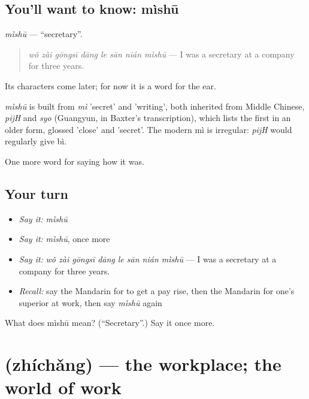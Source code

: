 \subsection*{You'll want to know: mìshū}
\emph{mìshū} — \textquotedblleft{}secretary\textquotedblright{}.

\begin{quote}
\emph{wǒ zài gōngsī dāng le sān nián mìshū} — I was a secretary at a company for three years.
\end{quote}

Its characters come later; for now it is a word for the ear.

\begin{cousinweb}
\emph{mìshū} is built from \emph{mì} 'secret' and  'writing', both inherited from Middle Chinese, \emph{pijH} and \emph{syo} (Guangyun, in Baxter's transcription), which lists the first in an older form, glossed 'close' and 'secret'. The modern mì is irregular: \emph{pijH} would regularly give bì.
\end{cousinweb}

\begin{grammarlens}[title={What you've built}]
One more word for saying how it was.
\end{grammarlens}

\subsection*{Your turn}
\begin{itemize}
\raggedright
  \item \emph{Say it:} \emph{mìshū}
  \item \emph{Say it:} \emph{mìshū}, once more
  \item \emph{Say it:} \emph{wǒ zài gōngsī dāng le sān nián mìshū} — I was a secretary at a company for three years.
  \item \emph{Recall:} say the Mandarin for to get a pay rise, then the Mandarin for one's superior at work, then say \emph{mìshū} again
\end{itemize}

\begin{tcolorbox}[breakable,colback=teal!4,colframe=teal!35!black,title={Before you move on}]
What does mìshū mean? (\textquotedblleft{}Secretary\textquotedblright{}.) Say it once more.
\end{tcolorbox}
\section[\texorpdfstring{\zh{职场} (zhíchǎng)}{职场 (zhíchǎng)}]{ (zhíchǎng) — the workplace; the world of work}

